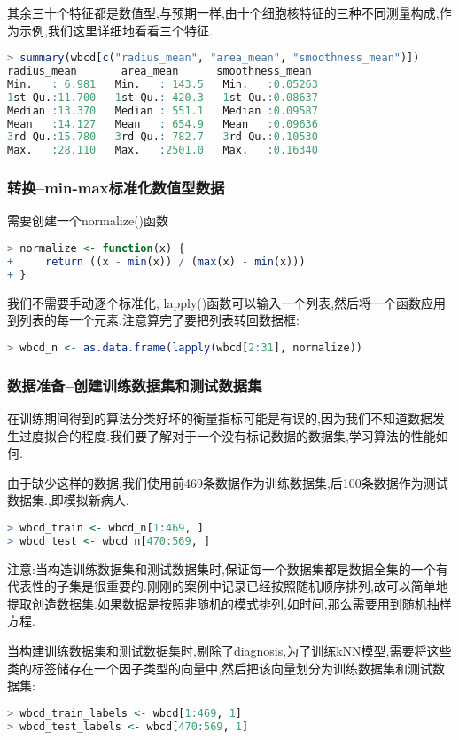 \documentclass[11pt,a4paper,oneside]{book}
\begin{document}
其余三十个特征都是数值型,与预期一样,由十个细胞核特征的三种不同测量构成,作为示例,我们这里详细地看看三个特征.

\begin{lstlisting}[language=r]
> summary(wbcd[c("radius_mean", "area_mean", "smoothness_mean")])
radius_mean       area_mean      smoothness_mean  
Min.   : 6.981   Min.   : 143.5   Min.   :0.05263  
1st Qu.:11.700   1st Qu.: 420.3   1st Qu.:0.08637  
Median :13.370   Median : 551.1   Median :0.09587  
Mean   :14.127   Mean   : 654.9   Mean   :0.09636  
3rd Qu.:15.780   3rd Qu.: 782.7   3rd Qu.:0.10530  
Max.   :28.110   Max.   :2501.0   Max.   :0.16340  
\end{lstlisting}
\subsubsection{转换--min-max标准化数值型数据}
需要创建一个normalize()函数
\begin{lstlisting}[language=r]
> normalize <- function(x) {
+     return ((x - min(x)) / (max(x) - min(x)))
+ }
\end{lstlisting}
我们不需要手动逐个标准化, lapply()函数可以输入一个列表,然后将一个函数应用到列表的每一个元素.注意算完了要把列表转回数据框:
\begin{lstlisting}[language=r]
> wbcd_n <- as.data.frame(lapply(wbcd[2:31], normalize))
\end{lstlisting}
\subsubsection{数据准备--创建训练数据集和测试数据集}
在训练期间得到的算法分类好坏的衡量指标可能是有误的,因为我们不知道数据发生过度拟合的程度.我们要了解对于一个没有标记数据的数据集,学习算法的性能如何.

由于缺少这样的数据,我们使用前469条数据作为训练数据集,后100条数据作为测试数据集.,即模拟新病人.
\begin{lstlisting}[language=r]
> wbcd_train <- wbcd_n[1:469, ]
> wbcd_test <- wbcd_n[470:569, ]
\end{lstlisting}
\begin{tcolorbox}[colback=pink!10!white,colframe=pink!100!black]
注意:当构造训练数据集和测试数据集时,保证每一个数据集都是数据全集的一个有代表性的子集是很重要的.刚刚的案例中记录已经按照随机顺序排列,故可以简单地提取创造数据集.如果数据是按照非随机的模式排列,如时间,那么需要用到随机抽样方程.
\end{tcolorbox}
当构建训练数据集和测试数据集时,剔除了diagnosis,为了训练kNN模型,需要将这些类的标签储存在一个因子类型的向量中,然后把该向量划分为训练数据集和测试数据集:
\begin{lstlisting}[language=r]
> wbcd_train_labels <- wbcd[1:469, 1]
> wbcd_test_labels <- wbcd[470:569, 1]
\end{lstlisting}
\end{document}
